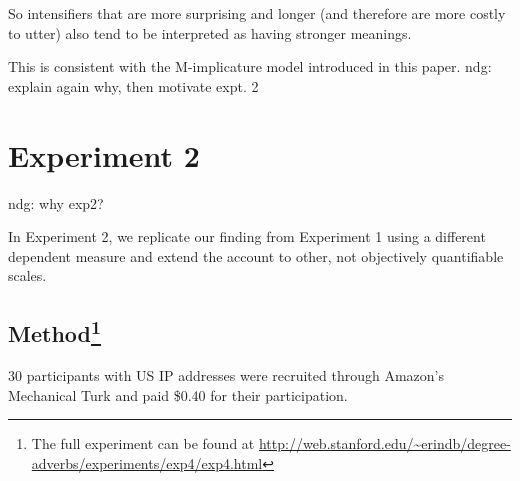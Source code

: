 \documentclass[10pt,letterpaper]{article}
\newcommand{\todo}[1]{{\color{red}#1}}
\begin{document}
So intensifiers that are more surprising and longer (and therefore are more costly to utter) also tend to be interpreted as having stronger meanings.

This is consistent with the M-implicature model introduced in this paper.
\todo{ndg: explain again why, then motivate expt. 2}


\section{Experiment 2}



\todo{ndg: why exp2?}


In Experiment 2, we replicate our finding from Experiment 1 using a different dependent measure and extend the account to other, not objectively quantifiable scales.

\subsection{Method\footnote{The full experiment can be found at \url{http://web.stanford.edu/~erindb/degree-adverbs/experiments/exp4/exp4.html}}}

30 participants with US IP addresses were recruited through Amazon's Mechanical Turk and paid \$0.40 for their participation.
\end{document}
